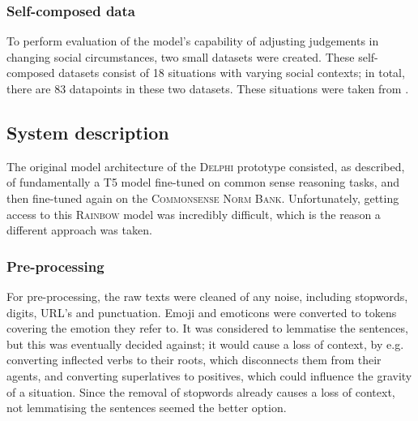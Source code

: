 \documentclass[final]{clv3} %
\begin{document}
\subsubsection{Self-composed data}

To perform evaluation of the model's capability of adjusting judgements in changing social circumstances, two small datasets were created. These self-composed datasets consist of 18 situations with varying social contexts; in total, there are 83 datapoints in these two datasets. These situations were taken from \citet{jiang}.

\subsection{System description}

The original model architecture of the \textsc{Delphi} prototype consisted, as described, of fundamentally a T5 model fine-tuned on common sense reasoning tasks, and then fine-tuned again on the \textsc{Commonsense Norm Bank}. Unfortunately, getting access to this \textsc{Rainbow} \cite{lourie} model was incredibly difficult, which is the reason a different approach was taken.

\subsubsection{Pre-processing}
For pre-processing, the raw texts were cleaned of any noise, including stopwords, digits, URL’s and punctuation. Emoji and emoticons were converted to tokens covering the emotion they refer to. It was considered to lemmatise the sentences, but this was eventually decided against; it would cause a loss of context, by e.g. converting inflected verbs to their roots, which disconnects them from their agents, and converting superlatives to positives, which could influence the gravity of a situation. Since the removal of stopwords already causes a loss of context, not lemmatising the sentences seemed the better option.\\
\end{document}
